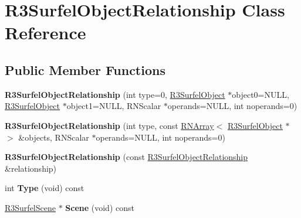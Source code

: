\hypertarget{class_r3_surfel_object_relationship}{}\section{R3\+Surfel\+Object\+Relationship Class Reference}
\label{class_r3_surfel_object_relationship}
\subsection*{Public Member Functions}
\begin{DoxyCompactItemize}
\item 
{\bfseries R3\+Surfel\+Object\+Relationship} (int type=0, \hyperlink{class_r3_surfel_object}{R3\+Surfel\+Object} $\ast$object0=N\+U\+LL, \hyperlink{class_r3_surfel_object}{R3\+Surfel\+Object} $\ast$object1=N\+U\+LL, R\+N\+Scalar $\ast$operands=N\+U\+LL, int noperands=0)\hypertarget{class_r3_surfel_object_relationship_a037c3991cd611b3d156fe8c16da7620f}{}\label{class_r3_surfel_object_relationship_a037c3991cd611b3d156fe8c16da7620f}

\item 
{\bfseries R3\+Surfel\+Object\+Relationship} (int type, const \hyperlink{class_r_n_array}{R\+N\+Array}$<$ \hyperlink{class_r3_surfel_object}{R3\+Surfel\+Object} $\ast$ $>$ \&objects, R\+N\+Scalar $\ast$operands=N\+U\+LL, int noperands=0)\hypertarget{class_r3_surfel_object_relationship_a1be8aaa17218e5fbb1504ba601016ec3}{}\label{class_r3_surfel_object_relationship_a1be8aaa17218e5fbb1504ba601016ec3}

\item 
{\bfseries R3\+Surfel\+Object\+Relationship} (const \hyperlink{class_r3_surfel_object_relationship}{R3\+Surfel\+Object\+Relationship} \&relationship)\hypertarget{class_r3_surfel_object_relationship_a94a14f93b8a847a3c2f800958746d6fa}{}\label{class_r3_surfel_object_relationship_a94a14f93b8a847a3c2f800958746d6fa}

\item 
int {\bfseries Type} (void) const \hypertarget{class_r3_surfel_object_relationship_a5f5424199965e19d18b9a4c064798e30}{}\label{class_r3_surfel_object_relationship_a5f5424199965e19d18b9a4c064798e30}

\item 
\hyperlink{class_r3_surfel_scene}{R3\+Surfel\+Scene} $\ast$ {\bfseries Scene} (void) const \hypertarget{class_r3_surfel_object_relationship_a777fb9c5c821444e5870a7d69a0b2cc9}{}\label{class_r3_surfel_object_relationship_a777fb9c5c821444e5870a7d69a0b2cc9}


\end{DoxyCompactItemize}
